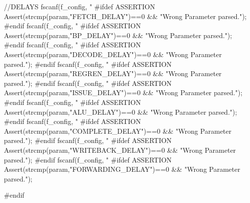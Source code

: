 \begin{DoxyCode}
{        //DELAYS
        fscanf(f_config, "%
        #ifdef ASSERTION
        Assert(strcmp(param,"FETCH_DELAY")==0 && "Wrong Parameter parsed.");
        #endif
        fscanf(f_config, "%
        #ifdef ASSERTION
        Assert(strcmp(param,"BP_DELAY")==0 && "Wrong Parameter parsed.");
        #endif
        fscanf(f_config, "%
        #ifdef ASSERTION
        Assert(strcmp(param,"DECODE_DELAY")==0 && "Wrong Parameter parsed.");
        #endif
        fscanf(f_config, "%
        #ifdef ASSERTION
        Assert(strcmp(param,"REGREN_DELAY")==0 && "Wrong Parameter parsed.");
        #endif
        fscanf(f_config, "%
        #ifdef ASSERTION
        Assert(strcmp(param,"ISSUE_DELAY")==0 && "Wrong Parameter parsed.");
        #endif
        fscanf(f_config, "%
        #ifdef ASSERTION
        Assert(strcmp(param,"ALU_DELAY")==0 && "Wrong Parameter parsed.");
        #endif
        fscanf(f_config, "%
        #ifdef ASSERTION
        Assert(strcmp(param,"COMPLETE_DELAY")==0 && "Wrong Parameter parsed.");
        #endif
        fscanf(f_config, "%
        #ifdef ASSERTION
        Assert(strcmp(param,"WRITEBACK_DELAY")==0 && "Wrong Parameter parsed.");
        #endif
        fscanf(f_config, "%
        #ifdef ASSERTION
        Assert(strcmp(param,"FORWARDING_DELAY")==0 && "Wrong Parameter parsed.");
      
        #endif

}
\end{DoxyCode}
